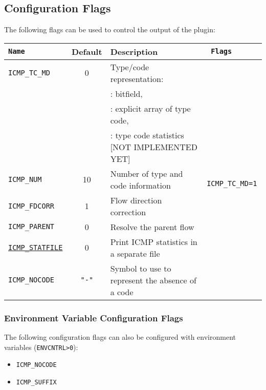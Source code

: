 \documentclass[documentation]{subfiles}
\begin{document}
\subsection{Configuration Flags}
The following flags can be used to control the output of the plugin:
\begin{longtable}{>{\tt}lcl>{\tt\small}l}
    \toprule
    {\bf Name} & {\bf Default} & {\bf Description} & {\bf Flags}\\
    \midrule\endhead%
    ICMP\_TC\_MD   & 0  & Type/code representation:                            & \\
                   &    & \qquad 0: bitfield,                                  & \\
                   &    & \qquad 1: explicit array of type code,               & \\
                   &    & \qquad 2: type code statistics [NOT IMPLEMENTED YET] & \\
    ICMP\_NUM      & 10 & Number of type and code information                  & ICMP\_TC\_MD=1\\
    ICMP\_FDCORR   & 1  & Flow direction correction                            & \\
    ICMP\_PARENT   & 0  & Resolve the parent flow                              & \\

    \hyperref[icmpDecode:additonalOutput]{ICMP\_STATFILE}
                   & 0  & Print ICMP statistics in a separate file\\

    ICMP\_NOCODE   & {\tt\small "-"}
                        & Symbol to use to represent the absence of a code     & \\
    \bottomrule
\end{longtable}

\subsubsection{Environment Variable Configuration Flags}
The following configuration flags can also be configured with environment variables ({\tt ENVCNTRL>0}):
\begin{itemize}
    \item {\tt ICMP\_NOCODE}
    \item {\tt ICMP\_SUFFIX}
\end{itemize}
\end{document}
